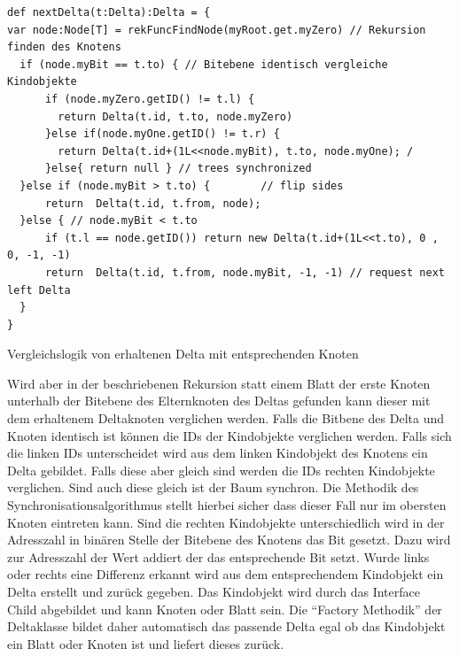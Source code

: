 \documentclass[a4paper,11pt,oneside,%
headsepline,												%
footsepline,												%
bibtotocnumbered									%
]{scrreprt}
\begin{document}
\begin{listing}[H]
	\begin{verbatim}
def nextDelta(t:Delta):Delta = {
var node:Node[T] = rekFuncFindNode(myRoot.get.myZero) // Rekursion finden des Knotens
  if (node.myBit == t.to) { // Bitebene identisch vergleiche Kindobjekte
      if (node.myZero.getID() != t.l) {
        return Delta(t.id, t.to, node.myZero)
      }else if(node.myOne.getID() != t.r) {
        return Delta(t.id+(1L<<node.myBit), t.to, node.myOne); /
      }else{ return null } // trees synchronized
  }else if (node.myBit > t.to) {        // flip sides
      return  Delta(t.id, t.from, node); 
  }else { // node.myBit < t.to
      if (t.l == node.getID()) return new Delta(t.id+(1L<<t.to), 0 , 0, -1, -1)
      return  Delta(t.id, t.from, node.myBit, -1, -1) // request next left Delta
  }
}
	\end{verbatim}
	\caption{Vergleichslogik von erhaltenen Delta mit entsprechenden Knoten}
	\label{lst:DeltaComp}
\end{listing}
Wird aber in der beschriebenen Rekursion statt einem Blatt der erste Knoten unterhalb der Bitebene des Elternknoten des Deltas gefunden kann dieser mit dem erhaltenem Deltaknoten verglichen werden. Falls die Bitbene des Delta und Knoten identisch ist können die \ac{ID}s der Kindobjekte verglichen werden. Falls sich die linken \ac{ID}s unterscheidet wird aus dem linken Kindobjekt des Knotens ein Delta gebildet. Falls diese aber gleich sind werden die \ac{ID}s rechten Kindobjekte verglichen. Sind auch diese gleich ist der Baum synchron. Die Methodik des Synchronisationsalgorithmus stellt hierbei sicher dass dieser Fall nur im obersten Knoten eintreten kann. Sind die rechten Kindobjekte unterschiedlich wird in der Adresszahl in binären Stelle der Bitebene des Knotens das Bit gesetzt. Dazu wird zur Adresszahl der Wert addiert der das entsprechende Bit setzt. Wurde links oder rechts eine Differenz erkannt wird aus dem entsprechendem Kindobjekt ein Delta erstellt und zurück gegeben. Das Kindobjekt wird durch das Interface Child abgebildet und kann Knoten oder Blatt sein. Die \enquote{Factory Methodik} der Deltaklasse bildet daher automatisch das passende Delta egal ob das Kindobjekt ein Blatt oder Knoten ist und liefert dieses zurück.\\\\
\end{document}
